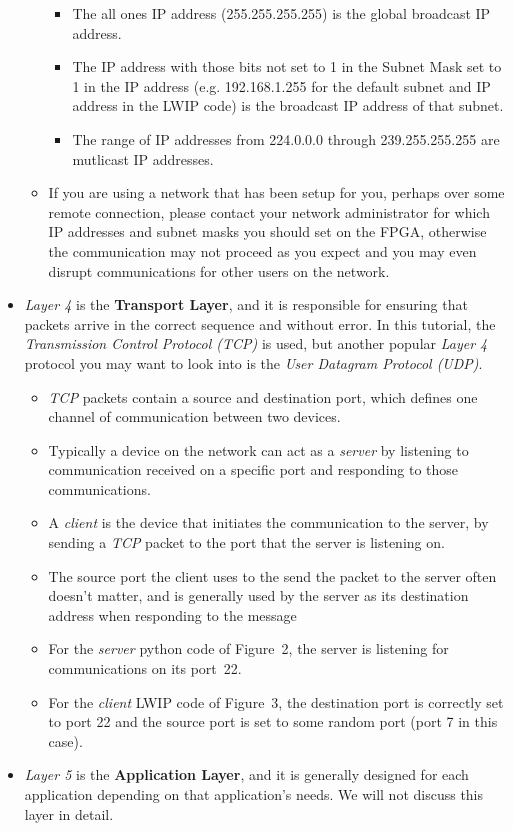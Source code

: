 \documentclass[11pt]{article}
\begin{document}
\begin{itemize}
\begin{itemize}
\begin{itemize}
            \item The all ones IP address (255.255.255.255) is the global broadcast IP address.
            \item The IP address with those bits not set to 1 in the Subnet Mask set to 1 in the IP address (e.g. 192.168.1.255 for the default subnet and IP address in the LWIP code) is the broadcast IP address of that subnet.
            \item The range of IP addresses from 224.0.0.0 through 239.255.255.255 are mutlicast IP addresses.
        \end{itemize}
        \item If you are using a network that has been setup for you, perhaps over some remote connection, please contact your network administrator for which IP addresses and subnet masks you should set on the FPGA, otherwise the communication may not proceed as you expect and you may even disrupt communications for other users on the network.
    \end{itemize}
    \item \textit{Layer 4} is the \textbf{Transport Layer}, and it is responsible for ensuring that packets arrive in the correct sequence and without error. In this tutorial, the \textit{Transmission Control Protocol (TCP)} is used, but another popular \textit{Layer 4} protocol you may want to look into is the \textit{User Datagram Protocol (UDP)}.
    \begin{itemize}
        \item \textit{TCP} packets contain a source and destination port, which defines one channel of communication between two devices.
        \item Typically a device on the network can act as a \textit{server} by listening to communication received on a specific port and responding to those communications.
        \item A \textit{client} is the device that initiates the communication to the server, by sending a \textit{TCP} packet to the port that the server is listening on.
        \item The source port the client uses to the send the packet to the server often doesn't matter, and is generally used by the server as its destination address when responding to the message
        \item For the \textit{server} python code of Figure~2, the server is listening for communications on its port~22.
        \item For the \textit{client} LWIP code of Figure~3, the destination port is correctly set to port 22 and the source port is set to some random port (port 7 in this case).
    \end{itemize}
    \item \textit{Layer 5} is the \textbf{Application Layer}, and it is generally designed for each application depending on that application's needs. We will not discuss this layer in detail.
\end{itemize}
\end{document}
